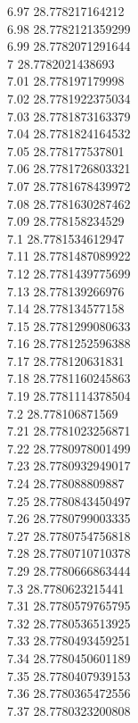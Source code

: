 {6.97	28.778217164212\\
6.98	28.7782121359299\\
6.99	28.7782071291644\\
7	28.7782021438693\\
7.01	28.778197179998\\
7.02	28.7781922375034\\
7.03	28.7781873163379\\
7.04	28.7781824164532\\
7.05	28.778177537801\\
7.06	28.7781726803321\\
7.07	28.7781678439972\\
7.08	28.7781630287462\\
7.09	28.778158234529\\
7.1	28.7781534612947\\
7.11	28.7781487089922\\
7.12	28.7781439775699\\
7.13	28.778139266976\\
7.14	28.778134577158\\
7.15	28.7781299080633\\
7.16	28.7781252596388\\
7.17	28.778120631831\\
7.18	28.7781160245863\\
7.19	28.7781114378504\\
7.2	28.778106871569\\
7.21	28.7781023256871\\
7.22	28.7780978001499\\
7.23	28.7780932949017\\
7.24	28.778088809887\\
7.25	28.7780843450497\\
7.26	28.7780799003335\\
7.27	28.7780754756818\\
7.28	28.7780710710378\\
7.29	28.7780666863444\\
7.3	28.7780623215441\\
7.31	28.7780579765795\\
7.32	28.7780536513925\\
7.33	28.7780493459251\\
7.34	28.7780450601189\\
7.35	28.7780407939153\\
7.36	28.7780365472556\\
7.37	28.7780323200808\\
}
